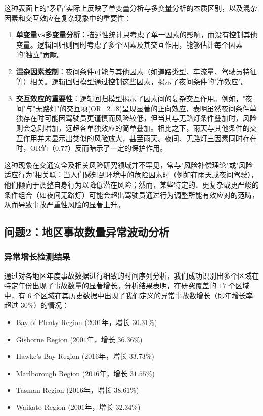 \documentclass[12pt,a4paper]{article}
\begin{document}
这种表面上的"矛盾"实际上反映了单变量分析与多变量分析的本质区别，以及混杂因素和交互效应在复杂现象中的重要性：

\begin{enumerate}
\item \textbf{单变量vs多变量分析}：描述性统计只考虑了单一因素的影响，而没有控制其他变量。逻辑回归则同时考虑了多个因素及其交互作用，能够估计每个因素的"独立"贡献。

\item \textbf{混杂因素控制}：夜间条件可能与其他因素（如道路类型、车流量、驾驶员特征等）相关。逻辑回归模型通过控制这些因素，揭示了夜间条件的"净效应"。

\item \textbf{交互效应的重要性}：逻辑回归模型揭示了因素间的复杂交互作用。例如，"夜间"与"无路灯"的交互项(OR=$2.18$)呈现显著的正向效应，表明虽然夜间条件单独存在时可能因驾驶员更谨慎而风险较低，但当其与无路灯条件叠加时，风险则会急剧增加，远超各单独效应的简单叠加。相比之下，雨天与其他条件的交互作用并未显示出类似的风险放大，甚至雨天、夜间、无路灯三因素同时存在时，OR值（$0.77$）反而暗示了一定的保护作用。
\end{enumerate}

这种现象在交通安全及相关风险研究领域并不罕见，常与"风险补偿理论"或"风险适应行为"相关联：当人们感知到环境中的危险因素时（例如在雨天或夜间驾驶），他们倾向于调整自身行为以降低潜在风险；然而，某些特定的、更复杂或更严峻的条件组合（如夜间无路灯）可能会超出驾驶员通过行为调整所能有效应对的范畴，从而导致事故严重性风险的显著上升。

\subsection{问题2：地区事故数量异常波动分析}

\subsubsection{异常增长检测结果}

通过对各地区年度事故数据进行细致的时间序列分析，我们成功识别出多个区域在特定年份出现了事故数量的显著增长。分析结果表明，在研究覆盖的 $17$ 个区域中，有 $6$ 个区域在其历史数据中出现了我们定义的异常事故数增长（即年增长率超过 $30\%$）的情况：

\begin{itemize}
\item Bay of Plenty Region ($2001$年，增长 $30.31\%$)
\item Gisborne Region ($2001$年，增长 $36.36\%$)
\item Hawke's Bay Region ($2016$年，增长 $33.73\%$)
\item Marlborough Region ($2016$年，增长 $31.55\%$)
\item Tasman Region ($2016$年，增长 $38.61\%$)
\item Waikato Region ($2001$年，增长 $32.34\%$)
\end{itemize}
\end{document}
